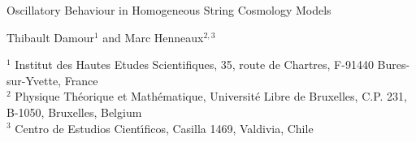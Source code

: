 \documentclass[a4paper,12pt]{article}
\begin{document}
\begin{titlepage}

\begin{centering}

{\Huge Oscillatory Behaviour in Homogeneous String Cosmology Models}

\vspace{2cm}

{\Large Thibault Damour$^1$ and Marc Henneaux$^{2,3}$} \\

\vspace{.4cm}

$^1$ Institut des Hautes Etudes Scientifiques,  35, route de
Chartres,  F-91440 Bures-sur-Yvette, France \\
\vspace{.2cm}
$^2$ Physique Th\'eorique et Math\'ematique,  Universit\'e Libre
de Bruxelles,  C.P. 231, B-1050, Bruxelles, Belgium  \\
\vspace{.2cm}
$^3$ Centro de Estudios Cient\'{\i}ficos, Casilla 1469, Valdivia, Chile
\vspace{1cm} 

\vspace{2cm}

\end{centering}

\begin{abstract}   

Some  spatially homogeneous Bianchi type I cosmological
models filled with homogeneous ``electric''
$p$-form fields 
are shown to mimic the never-ending oscillatory behaviour
of generic string cosmologies established recently.  The validity
of the ``Kasner-free-flights plus collisions-on-potential-walls'' picture
is also illustrated in the case of known, non-chaotic,
superstring solutions.

\end{abstract}


\vfill
\end{titlepage}     
\end{document}
